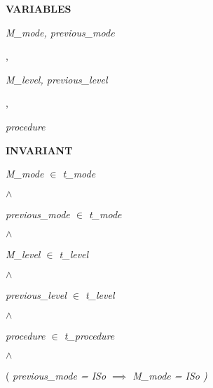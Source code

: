 \documentclass[11pt]{article}
\begin{document}
\begin{sloppypar}
\bf VARIABLES

\hspace*{0.20in}

\hspace*{0.20in}\it M\_mode\rm , \it previous\_mode

\hspace*{0.20in}\rm ,

\hspace*{0.20in}\it M\_level\rm , \it previous\_level

\hspace*{0.20in}\rm ,

\hspace*{0.20in}\it procedure

\hspace*{0.20in}

\bf INVARIANT

\hspace*{0.20in}

\hspace*{0.20in}\it M\_mode  $\in$  \it t\_mode

\hspace*{0.20in} $\land$ 

\hspace*{0.20in}\it previous\_mode  $\in$  \it t\_mode

\hspace*{0.20in} $\land$ 

\hspace*{0.20in}\it M\_level  $\in$  \it t\_level

\hspace*{0.20in} $\land$ 

\hspace*{0.20in}\it previous\_level  $\in$  \it t\_level

\hspace*{0.20in} $\land$ 

\hspace*{0.20in}\it procedure  $\in$  \it t\_procedure

\hspace*{0.20in} $\land$ 

\hspace*{0.20in}\hspace*{0.20in}\hspace*{0.20in}\hspace*{0.20in}\rm ( \it previous\_mode \rm = \it ISo  $\implies$  \it M\_mode \rm = \it ISo \rm )

\vspace*{4mm}
\hspace*{0.20in}


\end{sloppypar}
\end{document}

